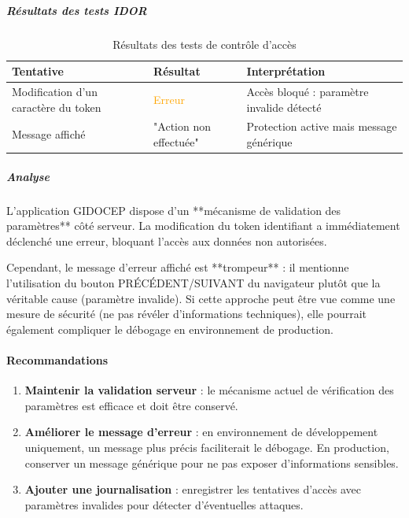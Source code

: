 \documentclass[12pt,a4paper,oneside]{report}
\begin{document}
\subparagraph{Résultats des tests IDOR}

\begin{table}[H]
	\centering
	\caption{Résultats des tests de contrôle d'accès}
	\label{tab:idor_resultats}
	\begin{tabularx}{\textwidth}{|>{\raggedright\arraybackslash}p{3.5cm}|>{\raggedright\arraybackslash}p{2.5cm}|X|}
		\hline
		\rowcolor{theadcolor}
		\color{white}\textbf{Tentative} &
		\color{white}\textbf{Résultat} &
		\color{white}\textbf{Interprétation} \\
		\hline
		Modification d'un caractère du token & \textcolor{orange}{Erreur} & Accès bloqué : paramètre invalide détecté \\
		\hline
		Message affiché & "Action non effectuée" & Protection active mais message générique \\
		\hline
	\end{tabularx}
\end{table}

\subparagraph{Analyse}

L'application GIDOCEP dispose d'un **mécanisme de validation des paramètres** 
côté serveur. La modification du token identifiant a immédiatement 
déclenché une erreur, bloquant l'accès aux données non autorisées.

Cependant, le message d'erreur affiché est **trompeur** : il mentionne 
l'utilisation du bouton PRÉCÉDENT/SUIVANT du navigateur plutôt que 
la véritable cause (paramètre invalide). Si cette approche peut être 
vue comme une mesure de sécurité (ne pas révéler d'informations 
techniques), elle pourrait également compliquer le débogage en 
environnement de production.

\paragraph{Recommandations}

\begin{enumerate}[label={\color{gold}\ding{70}}, leftmargin=*]
	\item \textbf{Maintenir la validation serveur} : le mécanisme 
	actuel de vérification des paramètres est efficace et doit être 
	conservé.
	
	\item \textbf{Améliorer le message d'erreur} : en environnement 
	de développement uniquement, un message plus précis faciliterait 
	le débogage. En production, conserver un message générique pour 
	ne pas exposer d'informations sensibles.
	
	\item \textbf{Ajouter une journalisation} : enregistrer les 
	tentatives d'accès avec paramètres invalides pour détecter 
	d'éventuelles attaques.
\end{enumerate}
\end{document}
